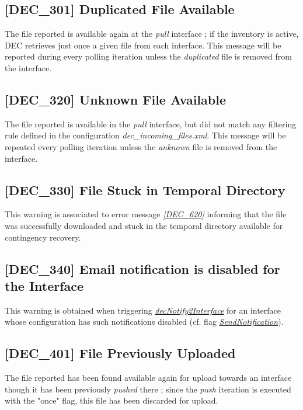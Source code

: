 \documentclass[dec_sum_main.tex]{subfiles}
\begin{document}
\label{DEC301}
\subsection{[DEC\_301] Duplicated File Available}
The file reported is available again at the \textit{pull} interface ; if the inventory is active, DEC retrieves just once a given file from each interface. This message will be reported during every polling iteration unless the \textit{duplicated} file is removed from the interface.

\label{DEC320}
\subsection{[DEC\_320] Unknown File Available}
The file reported is available in the \textit{pull} interface, but did not match any filtering rule defined in the configuration \textit{dec\_incoming\_files.xml}. This message will be repeated every polling iteration unless the \textit{unknown} file is removed from the interface.

\label{DEC330}
\subsection{[DEC\_330] File Stuck in Temporal Directory}
This warning is associated to error message \hyperref[DEC620]{\textit{[DEC\_620]}} informing that the file was successfully downloaded and stuck in the temporal directory available for contingency recovery.

\label{DEC340}
\subsection{[DEC\_340] Email notification is disabled for the Interface}
This warning is obtained when triggering \hyperref[decNotify2Interface]{\textit{decNotify2Interface}} for an interface whose configuration has such notifications disabled (cf. flag \hyperref[SendNotification]{\textit{SendNotification}}).

\label{DEC401}
\subsection{[DEC\_401] File Previously Uploaded}
The file reported has been found available again for upload towards an interface though it has been previously \textit{pushed} there ; since the \textit{push} iteration is executed with the "once" flag, this file has been discarded for upload.
\end{document}
